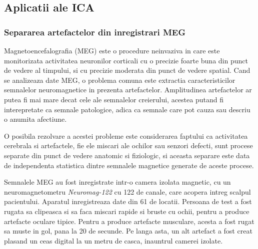 \documentclass[12pt]{article}
\begin{document}
\subsection{Aplicatii ale ICA}
\subsubsection{Separarea artefactelor din inregistrari MEG}
Magnetoencefalografia (MEG) este o procedure neinvaziva in care este monitorizata activitatea neuronilor corticali cu o precizie foarte buna din punct de vedere al timpului, si cu precizie moderata din punct de vedere spatial. Cand se analizeaza date MEG, o problema comuna este extractia caracteristicilor semnalelor neuromagnetice in prezenta artefactelor. Amplitudinea artefactelor ar putea fi mai mare decat cele ale semnalelor creierului, acestea putand fi interepretate ca semnale patologice, adica ca semnale care pot cauza sau descriu o anumita afectiune.

O posibila rezolvare a acestei probleme este considerarea faptului ca activitatea cerebrala si artefactele, fie ele miscari ale ochilor sau senzori defecti, sunt procese separate din punct de vedere anatomic si fiziologic, si aceasta separare este data de independenta statistica dintre semnalele magnetice generate de aceste procese.

Semnalele MEG au fost inregistrate intr-o camera izolata magnetic, cu un neuromagnetometru \textit{Neuromag-122} cu 122 de canale, care acopera intreg scalpul pacientului. Aparatul inregistreaza date din 61 de locatii. Persoana de test a fost rugata sa clipeasca si sa faca miscari rapide si bruste cu ochii, pentru a produce artefacte oculare tipice. Pentru a produce artefacte musculare, acesta a fost rugat sa muste in gol, pana la 20 de secunde. Pe langa asta, un alt artefact a fost creat plasand un ceas digital la un metru de casca, inauntrul camerei izolate.
\end{document}

